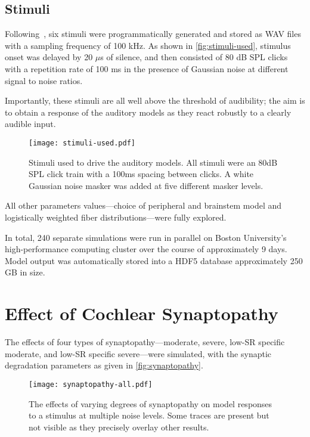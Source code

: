 \subsection{Stimuli} %
\label{sub:stimuli}
Following~\cite{Mehraei2015Auditory,Mehraei2016Auditory}, six stimuli were programmatically generated and stored as WAV files with a sampling frequency of 100 kHz.  As shown in \autoref{fig:stimuli-used}, stimulus onset was delayed by 20 $\mu$s of silence, and then consisted of 80 dB SPL clicks with a repetition rate of 100 ms in the presence of Gaussian noise at different signal to noise ratios. 

Importantly, these stimuli are all well above the threshold of audibility; the aim is to obtain a response of the auditory models as they react robustly to a clearly audible input. 

\begin{figure}[htbp]
	\centering
	\texttt{[image: stimuli-used.pdf]}
	\caption[Experimental Stimuli]{Stimuli used to drive the auditory models.  All stimuli were an 80dB SPL click train with a 100ms spacing between clicks.  A white Gaussian noise masker was added at five different masker levels.}
	\label{fig:stimuli-used}
\end{figure}

All other parameters values---choice of peripheral and brainstem model and logistically weighted fiber distributions---were fully explored.

In total, 240 separate simulations were run in parallel on Boston University's high-performance computing cluster over the course of approximately 9 days.  Model output was automatically stored into a HDF5 database approximately 250 GB in size.



\section{Effect of Cochlear Synaptopathy} %
\label{sec:effect_of_synaptopathy}
The effects of four types of synaptopathy---moderate, severe, low-SR specific moderate, and low-SR specific severe---were simulated, with the synaptic degradation parameters as given in \autoref{fig:synaptopathy}. 

\begin{figure}[htbp]
	\centering
	\texttt{[image: synaptopathy-all.pdf]}
	\caption[Effects of Synaptopathy]{The effects of varying degrees of synaptopathy on model responses to a stimulus at multiple noise levels.  Some traces are present but not visible as they precisely overlay other results.}
	\label{fig:synaptopathy_results}
\end{figure}

